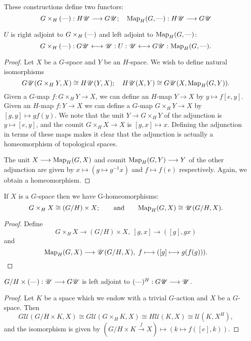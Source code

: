 \documentclass[11pt]{article}
\begin{document}
These constructions define two functors:
\[G\times_H(\DASH):H\mathscr{U}\to G\mathscr{U}; \hspace{10pt}
\textup{Map}_H(G,\DASH):H\mathscr{U}\to G\mathscr{U}\]
\begin{thm*} $U$ is right adjoint to $G\times_H(\DASH)$ and left adjoint to $\textup{Map}_H(G,\DASH)$:
\[G\times_H(\DASH):G\scrU\longleftrightarrow\scrU: U:\scrU\longleftrightarrow G\scrU: \Map_H(G,\DASH).\]
\end{thm*}
\begin{proof} Let $X$ be a $G$-space and $Y$ be an $H$-space. We wish to define natural isomorphisms
\[G\mathscr{U}(G\times_H Y,X)\cong H\mathscr{U}(Y,X);\hspace{10pt}
H\mathscr{U}(X,Y)\cong G\mathscr{U}(X,\textup{Map}_H(G,Y)).\]
Given a $G$-map $f:G\times_H Y\to X$, we can define an $H$-map $Y\to X$ by $y\mapsto f[e,y]$. Given an $H$-map $f:Y\to X$ we can define a $G$-map $G\times_H Y\to X$ by $[g,y]\mapsto gf(y)$. We note that the unit $Y\to G\times_H Y$ of the adjunction is $y\mapsto [e,y]$, and the counit $G\times_H X\to X$ is $[g,x]\mapsto x$. Defining the adjunction in terms of these maps makes it clear that the adjunction is actually a homeomorphism of topological spaces.

The unit $X\to\textup{Map}_H(G,X)$ and counit $\textup{Map}_H(G,Y)\to Y$ of the other adjunction are given by $x\mapsto (g\mapsto g^{-1}x)$ and $f\mapsto f(e)$ respectively. Again, we obtain a homeomorphism.
\end{proof}
\begin{thm*} If $X$ is a $G$-space then we have G-homeomorphisms:
\[G\times_H X\cong (G/H)\times X;\text{\qquad and\qquad}
\textup{Map}_H(G,X)\cong\mathscr{U}(G/H,X).\]
\end{thm*}
\begin{proof}
Define
\[G\times_H X\to (G/H)\times X,\hspace{3pt}[g,x]\to ([g],gx)\]
and
\[\textup{Map}_H(G,X)\to\mathscr{U}(G/H,X),\hspace{3pt}f\mapsto([g]\mapsto g(f(g))).\qedhere\]
\end{proof}
\begin{thm*} $G/H\times(\DASH):\mathscr{U}\to G\mathscr{U}$ is left adjoint to $(\DASH)^H:G\mathscr{U}\to\mathscr{U}$.
\end{thm*}
\begin{proof}
Let $K$ be a space which we endow with a trivial $G$-action and $X$ be a $G$-space. Then
\[G\mathscr{U}(G/H\times K, X)\cong G\mathscr{U}(G\times_H K,X)\cong
H\mathscr{U}(K,X)\cong\mathscr{U}(K,X^H),\]
and the isomorphism is given by $(G/H\times K\overset{f}{\to} X)\mapsto (k\mapsto f([e],k))$.
\end{proof}
\end{document}
